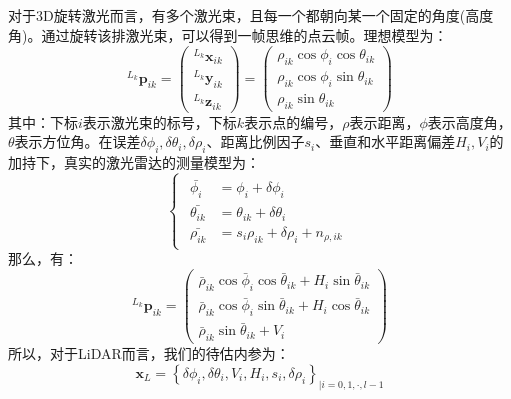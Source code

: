 \documentclass[12pt, twocolumn]{article}
\newcommand{\normf}{\kaishu}
\begin{document}
	\subsection{\normf{LiDAR内参模型}}
	对于3D旋转激光而言，有多个激光束，且每一个都朝向某一个固定的角度(高度角)。通过旋转该排激光束，可以得到一帧思维的点云帧。理想模型为：
	\begin{equation*}
		{^{L_k}\boldsymbol{p}_{ik}}=\begin{pmatrix}
			{^{L_k}\boldsymbol{x}_{ik}}\\
			{^{L_k}\boldsymbol{y}_{ik}}\\
			{^{L_k}\boldsymbol{z}_{ik}}
		\end{pmatrix}=\begin{pmatrix}
		\rho_{ik}\cos\phi_i\cos\theta_{ik}\\
		\rho_{ik}\cos\phi_i\sin\theta_{ik}\\
		\rho_{ik}\sin\theta_{ik}
	\end{pmatrix}
	\end{equation*}
	其中：下标$i$表示激光束的标号，下标$k$表示点的编号，$\rho$表示距离，$\phi$表示高度角，$\theta$表示方位角。在误差$\delta\phi_i,\delta\theta_i,\delta\rho_i$、距离比例因子$s_i$、垂直和水平距离偏差$H_i,V_i$的加持下，真实的激光雷达的测量模型为：
	\begin{equation*}
		\begin{cases}
			\begin{aligned}
				\bar{\phi_i}&=\phi_i+\delta\phi_i\\
				\bar{\theta_{ik}}&=\theta_{ik}+\delta\theta_i\\
				\bar{\rho_{ik}}&=s_i\rho_{ik}+\delta\rho_i+n_{\rho,ik}			\end{aligned}
		\end{cases}
	\end{equation*}
	那么，有：
		\begin{equation*}
		{^{L_k}\boldsymbol{p}_{ik}}=\begin{pmatrix}
			\bar{\rho}_{ik}\cos\bar{\phi}_i\cos\bar{\theta}_{ik}+H_i\sin\bar{\theta}_{ik}\\
			\bar{\rho}_{ik}\cos\bar{\phi}_i\sin\bar{\theta}_{ik}+H_i\cos\bar{\theta}_{ik}\\
			\bar{\rho}_{ik}\sin\bar{\theta}_{ik}+V_i
		\end{pmatrix}
	\end{equation*}
	所以，对于LiDAR而言，我们的待估内参为：
	\begin{equation*}
		\boldsymbol{x}_L=\left\lbrace \delta\phi_i,\delta\theta_i,V_i,H_i,s_i,\delta\rho_i \right\rbrace _{|i=0,1,\cdot,l-1}
	\end{equation*}
\end{document}
